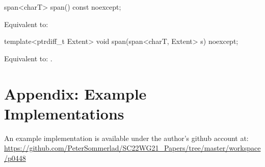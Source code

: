 \documentclass[ebook,11pt,article]{memoir}
\begin{document}
\begin{itemdecl}
span<charT> span() const noexcept;
\end{itemdecl}

\begin{itemdescr}
\pnum
\effects Equivalent to: \\
\end{itemdescr}

\begin{itemdecl}
template<ptrdiff_t Extent>
void span(span<charT, Extent> s) noexcept;
\end{itemdecl}

\begin{itemdescr}
\pnum
\effects
Equivalent to:
.
\end{itemdescr}



\chapter{Appendix: Example Implementations}
An example implementation is available under the author's github account at:
\url{https://github.com/PeterSommerlad/SC22WG21_Papers/tree/master/workspace/p0448}
\end{document}
